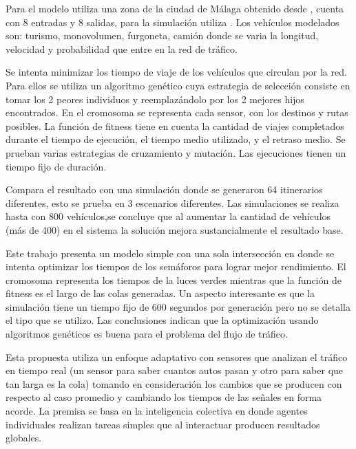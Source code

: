 \begin{itemize}
\begin{item}
Para el modelo utiliza una zona  de la ciudad de Málaga obtenido desde \citep{OSM}, cuenta con 8 entradas y 8 salidas, para la simulación utiliza \citep{SUMO}. Los vehículos modelados son: turismo, monovolumen, furgoneta, camión donde se varia la longitud, velocidad y probabilidad que entre en la red de tráfico.

Se intenta minimizar los tiempo de viaje de los vehículos que circulan por la red. Para ellos se utiliza un algoritmo genético cuya estrategia de selección consiste en tomar los 2 peores individuos y reemplazándolo por los 2 mejores hijos encontrados. En el cromosoma se representa cada sensor, con los destinos y rutas posibles. La función de fitness tiene en cuenta la cantidad de viajes completados durante el tiempo de ejecución, el tiempo medio utilizado, y el retraso medio. Se prueban varias estrategias de cruzamiento y mutación. Las ejecuciones tienen un tiempo fijo de duración.


Compara el resultado con una simulación donde se generaron 64 itinerarios diferentes, esto se prueba en 3 escenarios diferentes. Las simulaciones se realiza hasta con 800 vehículos,se concluye que al aumentar la cantidad de vehículos (más de 400) en el sistema la solución mejora sustancialmente el resultado base.

	\end{item}	
	
	
	\begin{item}
Este trabajo presenta un modelo simple con una sola intersección en donde se intenta optimizar los tiempos de los semáforos para lograr mejor rendimiento. El cromosoma representa los tiempos de la luces verdes mientras que la función de fitness es el largo de las colas generadas. Un aspecto interesante es que la simulación tiene un tiempo fijo de 600 segundos por generación pero no se detalla el tipo que se utilizo. Las conclusiones indican que la optimización usando algoritmos genéticos  es buena para el problema del flujo de tráfico.	
	\end{item}	


	\begin{item}
		\bibentry{Montana1996}
Esta propuesta utiliza un enfoque adaptativo con sensores que analizan el tráfico en tiempo real (un sensor para saber cuantos autos pasan y otro para saber que tan larga es la cola) tomando en consideración los cambios que se producen con respecto al caso promedio y cambiando los tiempos de las señales en forma acorde.
La premisa se basa en la inteligencia colectiva en donde agentes individuales realizan tareas simples que al interactuar producen resultados globales.


\end{item}
\end{itemize}
